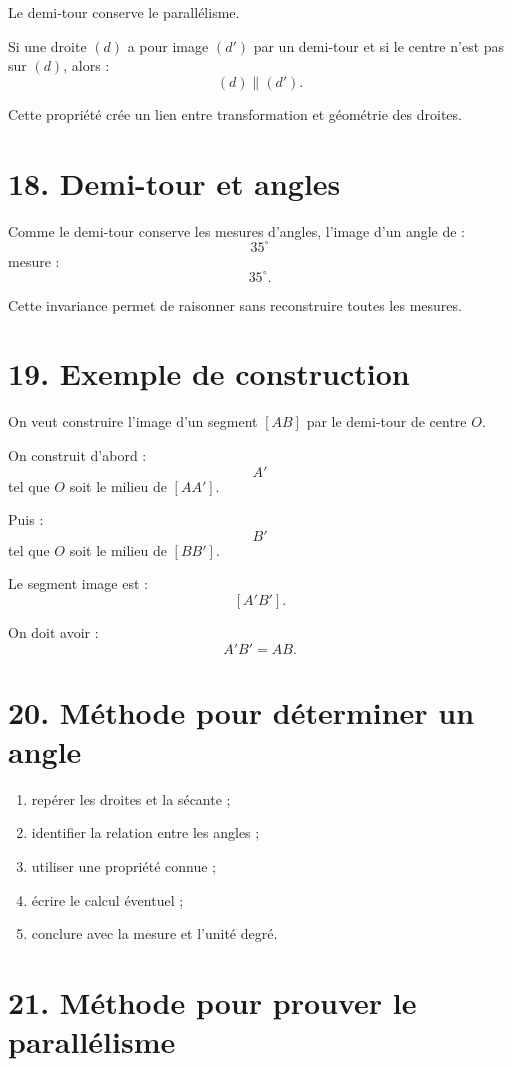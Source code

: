 Le demi-tour conserve le parallélisme.

Si une droite $(d)$ a pour image $(d')$ par un demi-tour et si le centre n'est pas sur $(d)$, alors :
\[
(d)\parallel(d').
\]

Cette propriété crée un lien entre transformation et géométrie des droites.

\section{18. Demi-tour et angles}

Comme le demi-tour conserve les mesures d'angles, l'image d'un angle de :
\[
35^\circ
\]
mesure :
\[
35^\circ.
\]

Cette invariance permet de raisonner sans reconstruire toutes les mesures.

\section{19. Exemple de construction}

On veut construire l'image d'un segment $[AB]$ par le demi-tour de centre $O$.

On construit d'abord :
\[
A'
\]
tel que $O$ soit le milieu de $[AA']$.

Puis :
\[
B'
\]
tel que $O$ soit le milieu de $[BB']$.

Le segment image est :
\[
[A'B'].
\]

On doit avoir :
\[
A'B'=AB.
\]

\section{20. Méthode pour déterminer un angle}

\begin{methode}
\begin{enumerate}
\item repérer les droites et la sécante ;
\item identifier la relation entre les angles ;
\item utiliser une propriété connue ;
\item écrire le calcul éventuel ;
\item conclure avec la mesure et l'unité degré.
\end{enumerate}
\end{methode}

\section{21. Méthode pour prouver le parallélisme}

